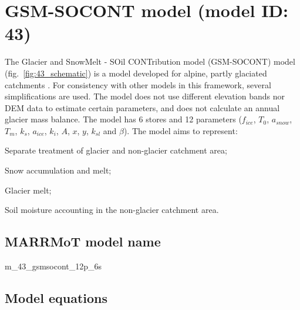 \section{GSM-SOCONT model (model ID: 43)}
The Glacier and SnowMelt - SOil CONTribution model (GSM-SOCONT) model (fig.~\ref{fig:43_schematic}) is a model developed for alpine, partly glaciated catchments \citep{Schaefli2005}. For consistency with other models in this framework, several simplifications are used. The model does not use different elevation bands nor DEM data to estimate certain parameters, and does not calculate an annual glacier mass balance. The model has 6 stores and 12 parameters ($f_{ice}$, $T_0$, $a_{snow}$, $T_m$, $k_s$, $a_{ice}$, $k_i$, $A$, $x$, $y$, $k_{sl}$ and $\beta$). The model aims to represent:

\begin{itemizecompact}
\item Separate treatment of glacier and non-glacier catchment area;
\item Snow accumulation and melt;
\item Glacier melt;
\item Soil moisture accounting in the non-glacier catchment area.
\end{itemizecompact}

\subsection{MARRMoT model name}
m\_43\_gsmsocont\_12p\_6s \\

\subsection{Model equations}

